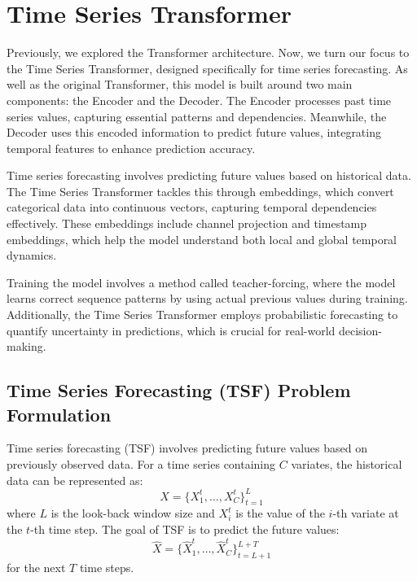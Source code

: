 \section{Time Series Transformer}

Previously, we explored the Transformer architecture. Now, we turn our focus to the Time Series Transformer, designed specifically for time series forecasting. As well as the original Transformer, this model is built around two main components: the Encoder and the Decoder. The Encoder processes past time series values, capturing essential patterns and dependencies. Meanwhile, the Decoder uses this encoded information to predict future values, integrating temporal features to enhance prediction accuracy.

Time series forecasting involves predicting future values based on historical data. The Time Series Transformer tackles this through embeddings, which convert categorical data into continuous vectors, capturing temporal dependencies effectively. These embeddings include channel projection and timestamp embeddings, which help the model understand both local and global temporal dynamics.

Training the model involves a method called teacher-forcing, where the model learns correct sequence patterns by using actual previous values during training. Additionally, the Time Series Transformer employs probabilistic forecasting to quantify uncertainty in predictions, which is crucial for real-world decision-making.

\subsection{Time Series Forecasting (TSF) Problem Formulation}
Time series forecasting (TSF) involves predicting future values based on previously observed data. For a time series containing \(C\) variates, the historical data can be represented as:
\[
X = \{X^t_1, \ldots, X^t_C\}_{t=1}^L
\]
where \(L\) is the look-back window size and \(X^t_i\) is the value of the \(i\)-th variate at the \(t\)-th time step. The goal of TSF is to predict the future values:
\[
\hat{X} = \{\hat{X}^t_1, \ldots, \hat{X}^t_C\}_{t=L+1}^{L+T}
\]
for the next \(T\) time steps.

